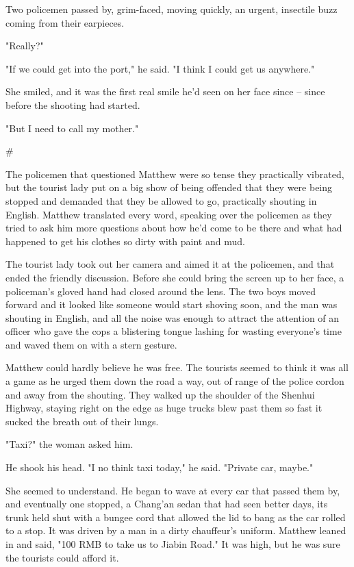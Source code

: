 Two policemen passed by, grim-faced, moving quickly, an urgent,
insectile buzz coming from their earpieces.

"Really?"

"If we could get into the port," he said. "I think I could get us
anywhere."

She smiled, and it was the first real smile he'd seen on her face
since -- since before the shooting had started.

"But I need to call my mother."

\#

The policemen that questioned Matthew were so tense they
practically vibrated, but the tourist lady put on a big show of
being offended that they were being stopped and demanded that they
be allowed to go, practically shouting in English. Matthew
translated every word, speaking over the policemen as they tried to
ask him more questions about how he'd come to be there and what had
happened to get his clothes so dirty with paint and mud.

The tourist lady took out her camera and aimed it at the policemen,
and that ended the friendly discussion. Before she could bring the
screen up to her face, a policeman's gloved hand had closed around
the lens. The two boys moved forward and it looked like someone
would start shoving soon, and the man was shouting in English, and
all the noise was enough to attract the attention of an officer who
gave the cops a blistering tongue lashing for wasting everyone's
time and waved them on with a stern gesture.

Matthew could hardly believe he was free. The tourists seemed to
think it was all a game as he urged them down the road a way, out
of range of the police cordon and away from the shouting. They
walked up the shoulder of the Shenhui Highway, staying right on the
edge as huge trucks blew past them so fast it sucked the breath out
of their lungs.

"Taxi?" the woman asked him.

He shook his head. "I no think taxi today," he said. "Private car,
maybe."

She seemed to understand. He began to wave at every car that passed
them by, and eventually one stopped, a Chang'an sedan that had seen
better days, its trunk held shut with a bungee cord that allowed
the lid to bang as the car rolled to a stop. It was driven by a man
in a dirty chauffeur's uniform. Matthew leaned in and said, "100
RMB to take us to Jiabin Road." It was high, but he was sure the
tourists could afford it.

